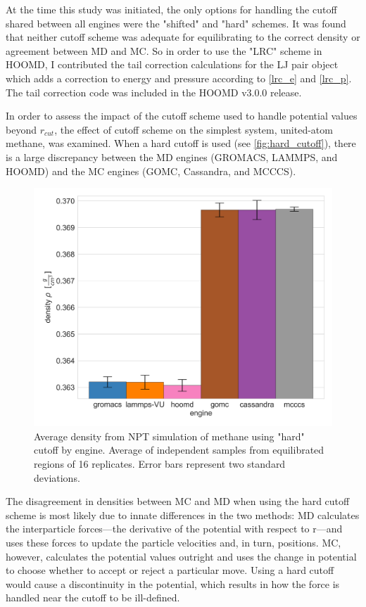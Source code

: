 At the time this study was initiated, the only options for handling the cutoff shared between all engines were the "shifted" and "hard" schemes.
It was found that neither cutoff scheme was adequate for equilibrating to the correct density or agreement between MD and MC.
So in order to use the "LRC" scheme in HOOMD, I contributed the tail correction calculations for the LJ pair object which adds a correction to energy and pressure according to \autoref{lrc_e} and \autoref{lrc_p}.
The tail correction code was included in the HOOMD v3.0.0 release.

In order to assess the impact of the cutoff scheme used to handle potential values beyond $r_{cut}$, the effect of cutoff scheme on the simplest system, united-atom methane, was examined. 
When a hard cutoff is used (see \autoref{fig:hard_cutoff}), there is a large discrepancy between the MD engines (GROMACS, LAMMPS, and HOOMD) and the MC engines (GOMC, Cassandra, and MCCCS). 
\begin{figure}[h!]
    \centering
    \includegraphics[width=0.8\linewidth,keepaspectratio]{figures/rep_study/hard_cutoff.png}
    \caption{Average density from NPT simulation of methane using "hard" cutoff by engine. Average of independent samples from equilibrated regions of 16 replicates. Error bars represent two standard deviations.}\label{fig:hard_cutoff}
\end{figure}
The disagreement in densities between MC and MD when using the hard cutoff scheme is most likely due to innate differences in the two methods: MD calculates the interparticle forces---the derivative of the potential with respect to r---and uses these forces to update the particle velocities and, in turn, positions. MC, however, calculates the potential values outright and uses the change in potential to choose whether to accept or reject a particular move.
Using a hard cutoff would cause a discontinuity in the potential, which results in how the force is handled near the cutoff to be ill-defined.

